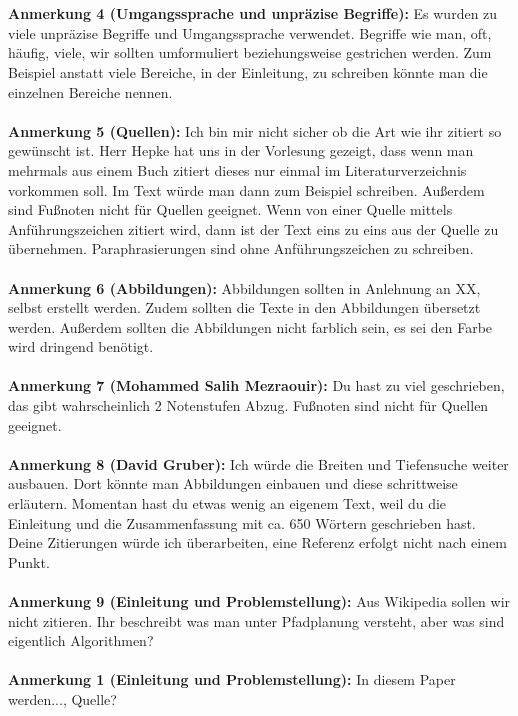 \documentclass[a4paper,12pt]{book}
\begin{document}
\\\\
\textbf{Anmerkung 4 (Umgangssprache und unpräzise Begriffe):}
Es wurden zu viele unpräzise Begriffe und Umgangssprache verwendet. Begriffe wie \glqq man, oft, häufig, viele, wir\grqq{} sollten umformuliert beziehungsweise gestrichen werden. Zum Beispiel anstatt \glqq viele Bereiche\grqq{}, in der Einleitung, zu schreiben könnte man die einzelnen Bereiche nennen. 
\\ \\
\textbf{Anmerkung 5 (Quellen):}
Ich bin mir nicht sicher ob die Art wie ihr zitiert so gewünscht ist. Herr Hepke hat uns in der Vorlesung gezeigt, dass wenn man mehrmals aus einem Buch zitiert dieses nur einmal im Literaturverzeichnis vorkommen soll. Im Text würde man dann zum Beispiel  \glqq [RN10, 92-102]\grqq{} schreiben. Außerdem sind Fußnoten nicht für Quellen geeignet. Wenn von einer Quelle mittels Anführungszeichen zitiert wird, dann ist der Text eins zu eins aus der Quelle zu übernehmen. Paraphrasierungen sind ohne Anführungszeichen zu schreiben. 
\\ \\
\textbf{Anmerkung 6 (Abbildungen):}
Abbildungen sollten in Anlehnung an XX, selbst erstellt werden. Zudem sollten die Texte in den Abbildungen übersetzt werden.  
Außerdem sollten die Abbildungen nicht farblich sein, es sei den Farbe wird dringend benötigt.
\\ \\
\textbf{Anmerkung 7 (Mohammed Salih Mezraouir):}
Du hast zu viel geschrieben, das gibt wahrscheinlich 2 Notenstufen Abzug. Fußnoten sind nicht für Quellen geeignet.
\\ \\
\textbf{Anmerkung 8 (David Gruber):}
Ich würde die Breiten und Tiefensuche weiter ausbauen. Dort könnte man Abbildungen einbauen und diese schrittweise erläutern. Momentan hast du etwas wenig an eigenem Text, weil du die Einleitung und die Zusammenfassung mit ca. 650 Wörtern geschrieben hast. Deine Zitierungen würde ich überarbeiten, eine Referenz erfolgt nicht nach einem Punkt. 
\\ \\
\textbf{Anmerkung 9 (Einleitung und Problemstellung):}
Aus Wikipedia sollen wir nicht zitieren. Ihr beschreibt was man unter Pfadplanung versteht, aber was sind eigentlich Algorithmen?\\ \\
\textbf{Anmerkung 1 (Einleitung und Problemstellung):}
\glqq In diesem Paper werden...\grqq, Quelle?
\end{document}

